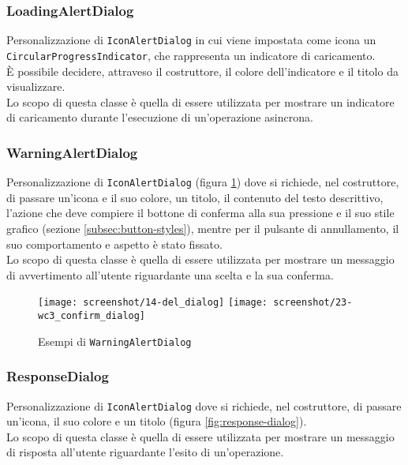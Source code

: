 \subsubsection*{LoadingAlertDialog}
\label{subsubsec:loading-alert-dialog}

Personalizzazione di \lstinline{IconAlertDialog} in cui viene impostata come icona un \lstinline{CircularProgressIndicator}\cite{site:circular-progress-indicator}, che rappresenta un indicatore di caricamento.\\
È possibile decidere, attraveso il costruttore, il colore dell'indicatore e il titolo da visualizzare.\\
Lo scopo di questa classe è quella di essere utilizzata per mostrare un indicatore di caricamento durante l'esecuzione di un'operazione asincrona.

\subsubsection*{WarningAlertDialog}
\label{subsubsec:warning-alert-dialog}

Personalizzazione di \lstinline{IconAlertDialog} (figura \ref{fig:warning-alert-dialog}) dove si richiede, nel costruttore, di passare un'icona e il suo colore, un titolo, il contenuto del testo descrittivo, l'azione che deve compiere il bottone di conferma alla sua pressione e il suo stile grafico (sezione \ref{subsec:button-styles}), mentre per il pulsante di annullamento, il suo comportamento e aspetto è stato fissato.\\
Lo scopo di questa classe è quella di essere utilizzata per mostrare un messaggio di avvertimento all'utente riguardante una scelta e la sua conferma.

\begin{figure}[!h] 
    \centering 
    \texttt{[image: screenshot/14-del\_dialog]} 
    \texttt{[image: screenshot/23-wc3\_confirm\_dialog]}
    \caption{Esempi di \lstinline{WarningAlertDialog}}
    \label{fig:warning-alert-dialog}
\end{figure}

\newpage

\subsubsection*{ResponseDialog}
\label{subsubsec:response-dialog}

Personalizzazione di \lstinline{IconAlertDialog} dove si richiede, nel costruttore, di passare un'icona, il suo colore e un titolo (figura \ref{fig:response-dialog}).\\
Lo scopo di questa classe è quella di essere utilizzata per mostrare un messaggio di risposta all'utente riguardante l'esito di un'operazione.\\

